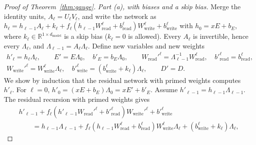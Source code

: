 \documentclass[10pt]{article}
\theoremstyle{definition}
\theoremstyle{remark}
\newcommand{\R}{\mathbb{R}}
\newcommand{\Wread}{W_{\mathrm{read}}}
\newcommand{\Wwrite}{W_{\mathrm{write}}}
\newcommand{\dm}{d_{\mathrm{model}}}
\begin{document}
\begin{proof}[Proof of Theorem~\ref{thm:gauge}]
\emph{Part (a), with biases and a skip bias.} Merge the identity units, $A_\ell = U_\ell V_\ell$, and write the network as $h_\ell = h_{\ell-1}A_\ell + k_\ell + f_\ell(h_{\ell-1}\Wread^{\ell} + b^{\ell}_{\mathrm{read}})\Wwrite^{\ell} + b^{\ell}_{\mathrm{write}}$ with $h_0 = xE + b_E$, where $k_\ell \in \R^{1\times\dm}$ is a skip bias ($k_\ell = 0$ is allowed). Every $A_\ell$ is invertible, hence every $\Lambda_\ell$, and $\Lambda_{\ell-1} = A_\ell\Lambda_\ell$. Define new variables and new weights
\begin{gather*}
h'_\ell = h_\ell\Lambda_\ell,\qquad E' = E\Lambda_0,\quad b'_E = b_E\Lambda_0,\qquad
\Wread'^{\ell} = \Lambda_{\ell-1}^{-1}\Wread^{\ell},\quad b'^{\ell}_{\mathrm{read}} = b^{\ell}_{\mathrm{read}},\\
\Wwrite'^{\ell} = \Wwrite^{\ell}\Lambda_\ell,\quad b'^{\ell}_{\mathrm{write}} = (b^{\ell}_{\mathrm{write}} + k_\ell)\Lambda_\ell,\qquad
D' = D .
\end{gather*}
We show by induction that the residual network with primed weights computes $h'_\ell$. For $\ell = 0$, $h'_0 = (xE + b_E)\Lambda_0 = xE' + b'_E$. Assume $h'_{\ell-1} = h_{\ell-1}\Lambda_{\ell-1}$. The residual recursion with primed weights gives
\begin{align*}
&h'_{\ell-1} + f_\ell(h'_{\ell-1}\Wread'^{\ell} + b'^{\ell}_{\mathrm{read}})\Wwrite'^{\ell} + b'^{\ell}_{\mathrm{write}}\\
&\qquad= h_{\ell-1}\Lambda_{\ell-1} + f_\ell(h_{\ell-1}\Wread^{\ell} + b^{\ell}_{\mathrm{read}})\Wwrite^{\ell}\Lambda_\ell + (b^{\ell}_{\mathrm{write}} + k_\ell)\Lambda_\ell,
\end{align*}

\end{proof}
\end{document}
